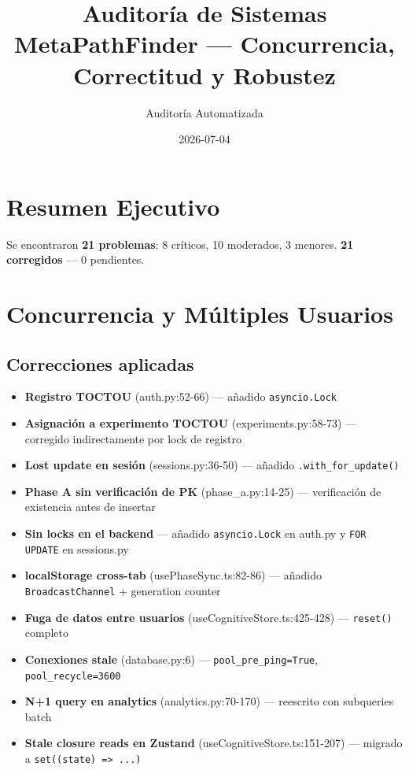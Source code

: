 \documentclass[12pt,a4paper]{article}
\title{\textbf{Auditoría de Sistemas}\\[0.5em]
\large MetaPathFinder --- Concurrencia, Correctitud y Robustez}
\author{Auditoría Automatizada}
\date{2026-07-04}
\begin{document}
\maketitle

\section{Resumen Ejecutivo}

Se encontraron \textbf{21 problemas}: 8 críticos, 10 moderados, 3 menores.
\textbf{21 corregidos} --- 0 pendientes.

\section{Concurrencia y Múltiples Usuarios}

\subsection{Correcciones aplicadas}

\begin{itemize}
  \item[\textcolor{red}{C}] \textbf{Registro TOCTOU} (auth.py:52-66) --- añadido \texttt{asyncio.Lock}
  \item[\textcolor{red}{C}] \textbf{Asignación a experimento TOCTOU} (experiments.py:58-73) --- corregido indirectamente por lock de registro
  \item[\textcolor{red}{C}] \textbf{Lost update en sesión} (sessions.py:36-50) --- añadido \texttt{.with\_for\_update()}
  \item[\textcolor{red}{C}] \textbf{Phase A sin verificación de PK} (phase\_a.py:14-25) --- verificación de existencia antes de insertar
  \item[\textcolor{red}{C}] \textbf{Sin locks en el backend} --- añadido \texttt{asyncio.Lock} en auth.py y \texttt{FOR UPDATE} en sessions.py
  \item[\textcolor{red}{C}] \textbf{localStorage cross-tab} (usePhaseSync.ts:82-86) --- añadido \texttt{BroadcastChannel} + generation counter
  \item[\textcolor{red}{C}] \textbf{Fuga de datos entre usuarios} (useCognitiveStore.ts:425-428) --- \texttt{reset()} completo
  \item[\textcolor{red}{C}] \textbf{Conexiones stale} (database.py:6) --- \texttt{pool\_pre\_ping=True}, \texttt{pool\_recycle=3600}
  \item[\textcolor{orange}{M}] \textbf{N+1 query en analytics} (analytics.py:70-170) --- reescrito con subqueries batch
  \item[\textcolor{orange}{M}] \textbf{Stale closure reads en Zustand} (useCognitiveStore.ts:151-207) --- migrado a \texttt{set((state) => ...)}
\end{itemize}
\end{document}
